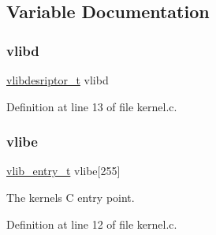 \subsection{Variable Documentation}
\mbox{\label{a00041_a2125beec541d04796805161dbec05fcf_a2125beec541d04796805161dbec05fcf}} 
\subsubsection{\texorpdfstring{vlibd}{vlibd}}
{\footnotesize\ttfamily \hyperlink{a00137_a2d9000b4fbb25c5ed2950a2d8f4921d5_a2d9000b4fbb25c5ed2950a2d8f4921d5}{vlibdesriptor\+\_\+t} vlibd}



Definition at line 13 of file kernel.\+c.

\mbox{\label{a00041_af69f4f709fdab28dec6b8fb75fb4d526_af69f4f709fdab28dec6b8fb75fb4d526}} 
\subsubsection{\texorpdfstring{vlibe}{vlibe}}
{\footnotesize\ttfamily \hyperlink{a00137_a97c1a7136f2ab06368e93c2d7533d619_a97c1a7136f2ab06368e93c2d7533d619}{vlib\+\_\+entry\+\_\+t} vlibe\mbox{[}255\mbox{]}}



The kernels C entry point. 



Definition at line 12 of file kernel.\+c.

